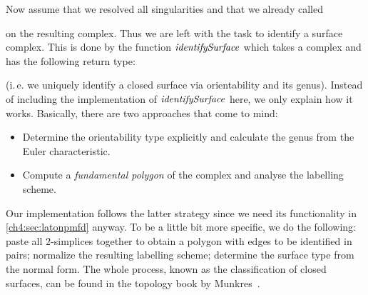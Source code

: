 Now assume that we resolved all singularities and that we already called\begin{hscode}\SaveRestoreHook
{}%
%
%
\>[3]{}\mathbin{::}\;\<[E]%
\ColumnHook
\end{hscode}\resethooks
on the resulting complex. Thus we are left with the task to identify a surface
complex. This is done by the function \ensuremath{\Varid{identifySurface}} which takes a complex
and has the following return type:
\resethooks
(i.\,e. we uniquely identify a closed surface via orientability
and its genus). Instead of including the implementation of
\ensuremath{\Varid{identifySurface}} here, we only explain how it works. Basically,
there are two approaches that come to mind:
\begin{itemize}[topsep=5pt,labelindent=0pt]
\item
    Determine the orientability type explicitly and calculate the genus from
    the Euler characteristic.
\item
    Compute a \emph{fundamental polygon} of the complex and analyse
    the labelling scheme.
\end{itemize}
Our implementation follows the latter strategy since we need its functionality
in \cref{ch4:sec:latonpmfd} anyway. To be a little bit more specific, we do the
following: paste all $2$-simplices together to obtain a polygon with edges to be
identified in pairs; normalize the resulting labelling scheme; determine the
surface type from the normal form. The whole process, known as the
classification of closed surfaces, can be found in the topology book by
Munkres~\cite[Ch.~12]{bookc:munkres00}.

